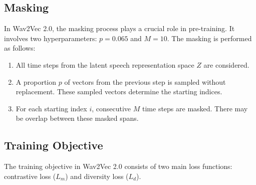 





\subsection{Masking}

In Wav2Vec 2.0, the masking process plays a crucial role in pre-training. 
It involves two hyperparameters: $p = 0.065$ and $M = 10$. 
The masking is performed as follows:
\begin{enumerate}
    \item All time steps from the latent speech representation space $Z$ are considered.
    \item A proportion $p$ of vectors from the previous step is sampled without replacement. These sampled vectors determine the starting indices.
    \item For each starting index $i$, consecutive $M$ time steps are masked. There may be overlap between these masked spans.
\end{enumerate}

\subsection{Training Objective}

The training objective in Wav2Vec 2.0 consists of two main loss functions: contrastive loss ($L_m$) and diversity loss ($L_d$).


